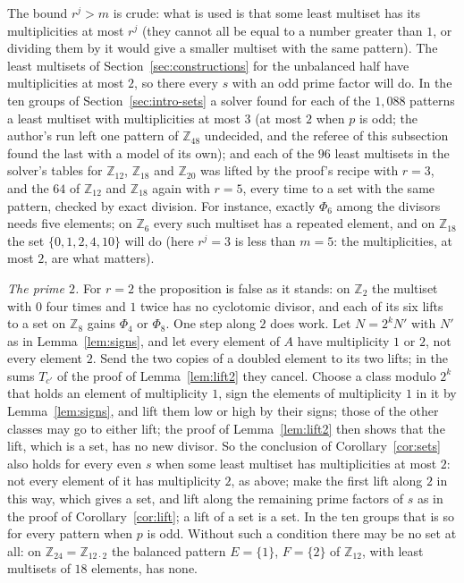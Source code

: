 \documentclass[11pt,a4paper]{amsart}
\theoremstyle{definition}
\theoremstyle{remark}
\newcommand{\Z}{\mathbb{Z}}
\begin{document}
The bound $r^j>m$ is crude: what is used is that some least multiset has its multiplicities at most $r^j$ (they
cannot all be equal to a number greater than $1$, or dividing them by it would give a smaller multiset with the
same pattern). The least multisets of Section~\ref{sec:constructions} for the unbalanced half have multiplicities at
most $2$, so there every $s$ with an odd prime factor will do. In the ten groups of Section~\ref{sec:intro-sets} a solver
found for each of the $1{,}088$ patterns a least multiset with multiplicities at most $3$ (at most $2$ when
$p$ is odd; the author's run left one pattern of $\Z_{48}$ undecided, and the referee of this subsection found the last with a model of its own); and each of the $96$ least multisets in the solver's tables for
$\Z_{12}$, $\Z_{18}$ and $\Z_{20}$ was lifted by the proof's recipe with $r=3$, and the $64$ of $\Z_{12}$ and $\Z_{18}$ again with $r=5$, every time to a set with the same
pattern, checked by exact division. For instance, exactly $\Phi_6$ among the divisors needs five elements; on $\Z_6$ every such
multiset has a repeated element, and on $\Z_{18}$ the set $\{0,1,2,4,10\}$ will do (here $r^j=3$ is less than $m=5$: the multiplicities, at most $2$, are what matters).

\emph{The prime $2$.} For $r=2$ the proposition is false as it stands: on $\Z_2$ the multiset with $0$ four times and $1$
twice has no cyclotomic divisor, and each of its six lifts to a set on $\Z_8$ gains $\Phi_4$ or $\Phi_8$. One step along $2$ does
work. Let $N=2^kN'$ with $N'$ as in Lemma~\ref{lem:signs}, and let every element of $A$ have multiplicity $1$ or $2$, not every
element $2$. Send the two copies of a doubled element to its two lifts; in the sums $T_{c'}$ of the proof of
Lemma~\ref{lem:lift2} they cancel. Choose a class modulo $2^k$ that holds an element of multiplicity $1$, sign the elements of
multiplicity $1$ in it by Lemma~\ref{lem:signs}, and lift them low or high by their signs; those of the other classes may go to either lift; the proof of Lemma~\ref{lem:lift2}
then shows that the lift, which is a set, has no new divisor. So the conclusion of Corollary~\ref{cor:sets} also holds for every even $s$ when some least multiset has multiplicities at most $2$: not every element of it has multiplicity $2$, as above; make the first lift along $2$ in this way, which gives a set, and lift along the remaining prime factors of $s$ as in the proof of Corollary~\ref{cor:lift}; a lift of a set is a set. In the ten groups that is so for every pattern when $p$ is odd. Without
such a condition there may be no set at all: on $\Z_{24}=\Z_{12\cdot2}$ the balanced pattern $E=\{1\}$, $F=\{2\}$ of $\Z_{12}$,
with least multisets of $18$ elements, has none.
\end{document}
